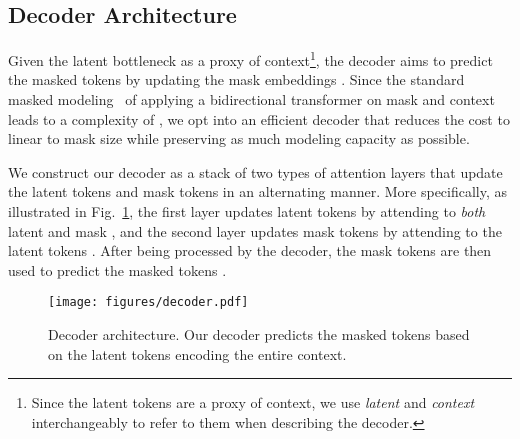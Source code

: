 \documentclass[10pt,twocolumn,letterpaper]{article}
\begin{document}
\subsection{Decoder Architecture}
\label{sec:mebt_decoder}
Given the latent bottleneck  as a proxy of context\footnote{
Since the latent tokens  are a proxy of context, we use \emph{latent} and \emph{context} interchangeably to refer to them when describing the decoder.}, the decoder aims to predict the masked tokens  by updating the mask embeddings .
Since the standard masked modeling~\cite{MaskGIT, BERT, MAE} of applying a bidirectional transformer on mask and context  leads to a complexity of , we opt into an efficient decoder that reduces the cost to linear to mask size  while preserving as much modeling capacity as possible.



We construct our decoder as a stack of two types of attention layers that update the latent tokens  and mask tokens  in an alternating manner.
More specifically, as illustrated in Fig.~\ref{fig:decoder}, the first layer updates latent tokens  by attending to \emph{both} latent and mask , and the second layer updates mask tokens  by attending to the latent tokens .
After being processed by the decoder, the mask tokens  are then used to predict the masked tokens .

\begin{figure}[t]
    \centering
    \texttt{[image: figures/decoder.pdf]}
    \vspace{-0.3cm}
    \caption{Decoder architecture. Our decoder predicts the masked tokens based on the latent tokens encoding the entire context.}
    \label{fig:decoder}
    \vspace{-0.4cm}
\end{figure}
\end{document}
